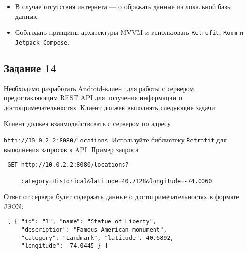 \documentclass[a4paper,12pt]{article}
\begin{document}
\begin{itemize}  \item В случае отсутствия интернета — отображать данные из локальной базы данных. \item Соблюдать принципы архитектуры MVVM и использовать \texttt{Retrofit}, \texttt{Room} и \texttt{Jetpack Compose}. \end{itemize}

\subsection*{Задание 14}

Необходимо разработать Android-клиент для работы с сервером, предоставляющим REST API для получения информации о достопримечательностях. Клиент должен выполнять следующие задачи:


Клиент должен взаимодействовать с сервером по адресу 

\texttt{http://10.0.2.2:8080/locations}. Используйте библиотеку \texttt{Retrofit} для выполнения запросов к API. Пример запроса:

\begin{verbatim} GET http://10.0.2.2:8080/locations?

     category=Historical&latitude=40.7128&longitude=-74.0060 \end{verbatim}

Ответ от сервера будет содержать данные о достопримечательностях в формате JSON:

\begin{verbatim} [ { "id": "1", "name": "Statue of Liberty", 
     "description": "Famous American monument",
     "category": "Landmark", "latitude": 40.6892, 
     "longitude": -74.0445 } ] \end{verbatim}

\end{document}
